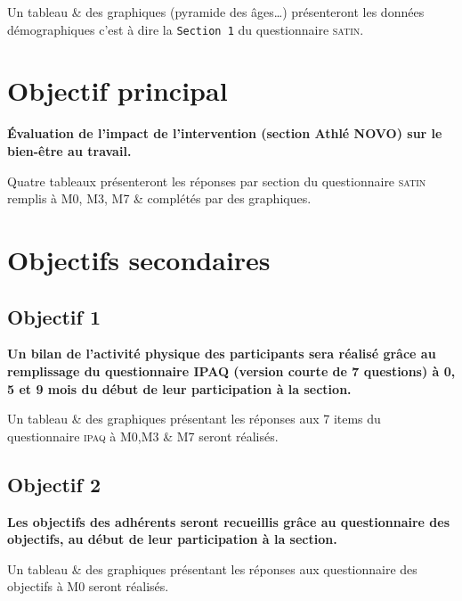 \documentclass[
  a4paper,
  french,
  fontsize=10pt,
  oneside]{scrartcl}
\begin{document}
Un tableau \& des graphiques (pyramide des âges\dots) présenteront les
données démographiques c'est à dire la \texttt{Section\ 1} du
questionnaire \textsc{satin}.

\hypertarget{objectif-principal}{%
\section{Objectif principal}\label{objectif-principal}}

\textbf{Évaluation de l'impact de l'intervention (section Athlé NOVO)
sur le bien-être au travail.}

Quatre tableaux présenteront les réponses par section du questionnaire
\textsc{satin} remplis à M0, M3, M7 \& complétés par des
graphiques.

\hypertarget{objectifs-secondaires}{%
\section{Objectifs secondaires}\label{objectifs-secondaires}}

\hypertarget{objectif-1}{%
\subsection{Objectif 1}\label{objectif-1}}

\textbf{Un bilan de l'activité physique des participants sera réalisé
grâce au remplissage du questionnaire IPAQ (version courte de 7
questions) à 0, 5 et 9 mois du début de leur participation à la
section.}

Un tableau \& des graphiques présentant les réponses aux 7 items du
questionnaire \textsc{ipaq} à M0,M3 \& M7 seront réalisés.

\hypertarget{objectif-2}{%
\subsection{Objectif 2}\label{objectif-2}}

\textbf{Les objectifs des adhérents seront recueillis grâce au
questionnaire des objectifs, au début de leur participation à la
section.}

Un tableau \& des graphiques présentant les réponses aux questionnaire
des objectifs à M0 seront réalisés.
\end{document}
